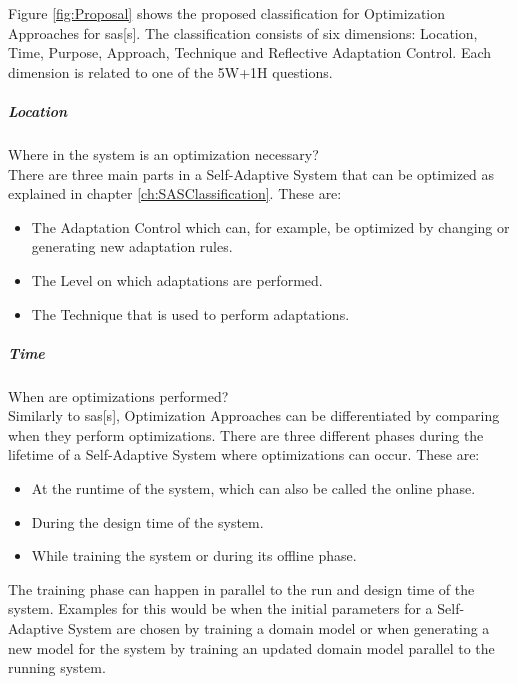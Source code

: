 \noindent Figure \ref{fig:Proposal} shows the proposed classification for Optimization Approaches for \acrlong{sas}[s].
The classification consists of six dimensions: Location, Time, Purpose, Approach, Technique and Reflective Adaptation Control.
Each dimension is related to one of the 5W+1H questions.

\subparagraph*{Location}
Where in the system is an optimization necessary? \\
There are three main parts in a Self-Adaptive System that can be optimized as explained in chapter \ref{ch:SASClassification}.
These are:
\begin{itemize}[nosep]
    \item The Adaptation Control which can, for example, be optimized by changing or generating new adaptation rules.
    \item The Level on which adaptations are performed.
    \item The Technique that is used to perform adaptations.
\end{itemize}

\subparagraph*{Time}
When are optimizations performed? \\
Similarly to \acrlong{sas}[s], Optimization Approaches can be differentiated by comparing when they perform optimizations.
There are three different phases during the lifetime of a Self-Adaptive System where optimizations can occur.
These are:
\begin{itemize}[nosep]
    \item At the runtime of the system, which can also be called the online phase.
    \item During the design time of the system.
    \item While training the system or during its offline phase.
\end{itemize}
The training phase can happen in parallel to the run and design time of the system.
Examples for this would be when the initial parameters for a Self-Adaptive System are chosen by training a domain model
or when generating a new model for the system by training an updated domain model parallel to the running system.

